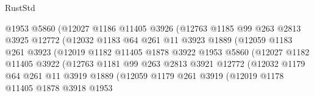 \begin{lexlean}{RustStd}
\begin{coremodule}
{\begin{coremodule}
{{{{{{{{{{{{{{{{{{{{{{{{{{{{{                            @1953
                            @5860
                            (@12027
                              @1186
                              @11405
                              @3926
                              (@12763
                                @1185
                                @99
                                @263
                                @2813
                                @3925
                                @12772
                                (@12032
                                  @1183
                                  @64
                                  @261
                                  @11
                                  @3923
                                  @1889
                                  (@12059
                                    @1183
                                    @261
                                    @3923
                                    (@12019
                                      @1182
                                      @11405
                                      @1878
                                      @3922
                                      @1953
                                      @5860
                                      (@12027
                                        @1182
                                        @11405
                                        @3922
                                        (@12763
                                          @1181
                                          @99
                                          @263
                                          @2813
                                          @3921
                                          @12772
                                          (@12032
                                            @1179
                                            @64
                                            @261
                                            @11
                                            @3919
                                            @1889
                                            (@12059
                                              @1179
                                              @261
                                              @3919
                                              (@12019
                                                @1178
                                                @11405
                                                @1878
                                                @3918
                                                @1953
}}}}}}}}}}}}}}}}}}}}}}}}}}}}}
\end{coremodule}}
\end{coremodule}
\end{lexlean}
